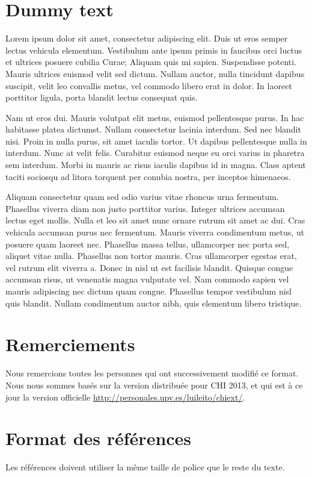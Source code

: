 \documentclass{chi-ext}
\begin{document}
\section{Dummy text}
Lorem ipsum dolor sit amet, consectetur adipiscing elit. Duis ut eros semper lectus vehicula elementum. Vestibulum ante ipsum primis in faucibus orci luctus et ultrices posuere cubilia Curae; Aliquam quis mi sapien. Suspendisse potenti. Mauris ultrices euismod velit sed dictum. Nullam auctor, nulla tincidunt dapibus suscipit, velit leo convallis metus, vel commodo libero erat in dolor. In laoreet porttitor ligula, porta blandit lectus consequat quis. 

Nam ut eros dui. Mauris volutpat elit metus, euismod pellentesque purus. In hac habitasse platea dictumst. Nullam consectetur lacinia interdum. Sed nec blandit nisi. Proin in nulla purus, sit amet iaculis tortor. Ut dapibus pellentesque nulla in interdum. Nunc at velit felis. Curabitur euismod neque eu orci varius in pharetra sem interdum. Morbi in mauris ac risus iaculis dapibus id in magna. Class aptent taciti sociosqu ad litora torquent per conubia nostra, per inceptos himenaeos.

Aliquam consectetur quam sed odio varius vitae rhoncus urna fermentum. Phasellus viverra diam non justo porttitor varius. Integer ultrices accumsan lectus eget mollis. Nulla et leo sit amet nunc ornare rutrum sit amet ac dui. Cras vehicula accumsan purus nec fermentum. Mauris viverra condimentum metus, ut posuere quam laoreet nec. Phasellus massa tellus, ullamcorper nec porta sed, aliquet vitae nulla. Phasellus non tortor mauris. Cras ullamcorper egestas erat, vel rutrum elit viverra a. Donec in nisl ut est facilisis blandit. Quisque congue accumsan risus, ut venenatis magna vulputate vel. Nam commodo sapien vel mauris adipiscing nec dictum quam congue. Phasellus tempor vestibulum nisl quis blandit. Nullam condimentum auctor nibh, quis elementum libero tristique.



\section{Remerciements}
Nous remercions toutes les personnes qui ont successivement modifié ce format. Nous nous sommes basés sur la version distribuée pour CHI 2013, et qui est à ce jour la version officielle \url{http://personales.upv.es/luileito/chiext/}.

\section{Format des références}
Les références doivent utiliser la même taille de police que le reste du texte.

\balance


\end{document}
